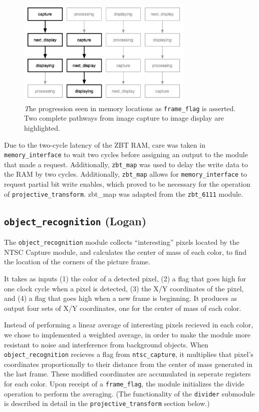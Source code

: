 \documentclass[10pt]{article}
\begin{document}
\begin{figure}[h!]
\centering
\includegraphics[width=0.75\textwidth]{images/buffers.png}
\caption{{\emph The progression seen in memory locations as {\tt frame\_flag} is asserted. Two complete pathways from image capture to image display are highlighted.}}
\end{figure}

Due to the two-cycle latency of the ZBT RAM, care was taken in {\tt memory\_interface} to wait two cycles before assigning an output to the module that made a request. Additionally, {\tt zbt\_map} was used to delay the write data to the RAM by two cycles. Additionally, {\tt zbt\_map} allows for {\tt memory\_interface} to request partial bit write enables, which proved to be necessary for the operation of {\tt projective\_transform}. {zbt\_map} was adapted from the {\tt zbt\_6111} module.

\subsection{{\tt object\_recognition} (Logan)}
The {\tt object\_recognition} module collects ``interesting'' pixels located by the NTSC Capture module, and calculates the center of mass of each color, to find the location of the corners of the picture frame.

It takes as inputs (1) the color of a detected pixel, (2) a flag that goes high for one clock cycle when a pixel is detected, (3) the X/Y coordinates of the pixel, and (4) a flag that goes high when a new frame is beginning. It produces as output four sets of X/Y coordinates, one for the center of mass of each color.

Instead of performing a linear average of interesting pixels recieved in each color, we chose to implemented a weighted average, in order to make the module more resistant to noise and interference from background objects. When {\tt object\_recognition} recieves a flag from {\tt ntsc\_capture}, it multiplies that pixel's coordinates proportionally to their distance from the center of mass generated in the last frame. These modified coordinates are accumulated in seperate registers for each color. Upon receipt of a {\tt frame\_flag}, the module initializes the divide operation to perform the averaging. (The functionality of the {\tt divider} submodule is described in detail in the {\tt projective\_transform} section below.)
\end{document}
